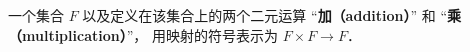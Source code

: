 

一个集合 $F$ 以及定义在该集合上的两个二元运算 “\textbf{加（addition）}” 和 “\textbf{乘（multiplication）}”， 用映射的符号表示为 $F\times F \to F$．
